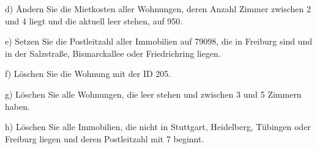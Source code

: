 \documentclass[11pt, a4paper, oneside]{article}
\begin{document}
	\lines[2cm]
	
	\pagebreak
	
	d) Ändern Sie die Mietkosten aller Wohnungen, deren Anzahl Zimmer zwischen 2 und 4 liegt und die aktuell leer stehen, auf 950.
	
	\lines[2cm]
	
	e) Setzen Sie die Postleitzahl aller Immobilien auf 79098, die in Freiburg sind und in der Salzstraße, Bismarckallee oder Friedrichring liegen.
	
	\lines[2cm]
	
	f) Löschen Sie die Wohnung mit der ID 205.
	
	\lines [2cm]
	
	g) Löschen Sie alle Wohnungen, die leer stehen und zwischen 3 und 5 Zimmern haben.
	
	\lines[2cm]
	
	h) Löschen Sie alle Immobilien, die nicht in Stuttgart, Heidelberg, Tübingen oder Freiburg liegen und deren Postleitzahl mit 7 beginnt.
	
	\lines[2cm]
\end{document}
